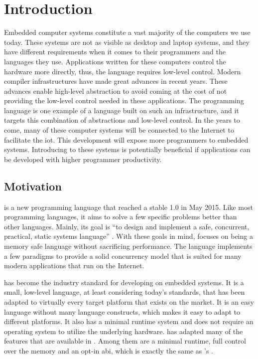 
\chapter{Introduction}
\label{chap:intro}

Embedded computer systems constitute a vast majority of the computers we use today.
These systems are not as visible as desktop and laptop systems, and they have different requirements when it comes to their programmers and the languages they use.
Applications written for these computers control the hardware more directly, thus, the language requires low-level control.
Modern compiler infrastructures have made great advances in recent years.
These advances enable high-level abstraction to avoid coming at the cost of not providing the low-level control needed in these applications.
The {\rust} programming language is one example of a language built on such an infrastructure, and it targets this combination of abstractions and low-level control.
In the years to come, many of these computer systems will be connected to the Internet to facilitate the \glsdesc{iot}.
This development will expose more programmers to embedded systems.
Introducing {\rust} to these systems is potentially beneficial if applications can be developed with higher programmer productivity.


\section{Motivation} %
\label{sec:intro:rust_as_replacement_to_c}

{\rust} is a new programming language that reached a stable 1.0 in May 2015.
Like most programming languages, it aims to solve a few specific problems better than other languages.
Mainly, its goal is ``to design and implement a safe, concurrent, practical, static systems language'' \cite{web:rust_faq}.
With these goals in mind, {\rust} focuses on being a memory safe language without sacrificing performance.
The language implements a few paradigms to provide a solid concurrency model that is suited for many modern applications that run on the Internet.

{\C} has become the industry standard for developing on embedded systems.
It is a small, low-level language, at least considering today's standards, that has been adapted to virtually every target platform that exists on the market.
It is an easy language without many language constructs, which makes it easy to adapt to different platforms.
It also has a minimal runtime system and does not require an operating system to utilize the underlying hardware.
{\rust} has adapted many of the features that are available in {\C}.
Among them are a minimal runtime, full control over the memory and an opt-in \gls{abi}, which is exactly the same as {\C}'s \cite{web:rust_once_run_everywhere}.

